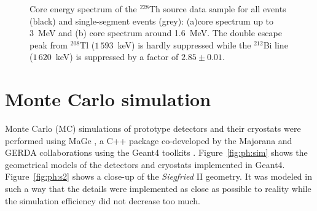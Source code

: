 \begin{figure}[htbp]
\centering
{}%
%
\caption{Core energy spectrum of the $^{228}$Th source data sample for all events (black) and single-segment events (grey): (a)core spectrum up to 3~MeV and (b) core spectrum around 1.6~MeV. The double escape peak from $^{208}$Tl ($1\,593$~keV) is hardly suppressed while the $^{212}$Bi line ($1\,620$~keV) is suppressed by a factor of $2.85 \pm 0.01$.}
\label{fig:ph:seg}
\end{figure}

\section{Monte Carlo simulation}
\label{sec:ph:sim}
Monte Carlo (MC) simulations of prototype detectors and their cryostats were performed using MaGe \cite{Mag08}, a C++ package co-developed by the Majorana and GERDA collaborations using the Geant4 toolkits \cite{Gea03,Gea06}. Figure~\ref{fig:ph:sim} shows the geometrical models of the detectors and cryostats implemented in Geant4. Figure~\ref{fig:ph:s2} shows a close-up of the \emph{Siegfried} II geometry. It was modeled in such a way that the details were implemented as close as possible to reality while the simulation efficiency did not decrease too much.
 
